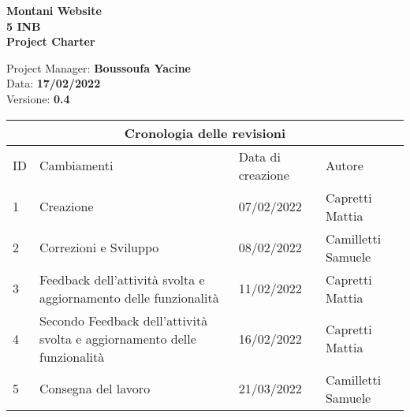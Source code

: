 \documentclass{article}
\begin{document}
	

	

	\begin{titlepage}

		\begin{center}

			\huge\textbf{Montani Website}\\

			\Large\textbf{5 INB}\\

			\Large \textbf{Project Charter}\\

			\vspace{4cm}

			\large Project Manager: \textbf{Boussoufa Yacine}\\

			\large Data: \textbf{17/02/2022}\\

			\large Versione: \textbf{0.4}\\

		\end{center}

	\end{titlepage}

	

	\clearpage

	

	\begin{tabular}{ |p{1cm}|p{4cm}|p{3cm}|p{2cm}|  }

		\hline

		\multicolumn{4}{|c|}{Cronologia delle revisioni} \\

		\hline

		ID& Cambiamenti &Data di creazione&Autore\\

		\hline

		1   & Creazione    &07/02/2022&   Capretti Mattia\\

		\hline

		2   & Correzioni e Sviluppo    &08/02/2022&   Camilletti Samuele\\

		\hline

		3   & Feedback dell'attività svolta e aggiornamento delle funzionalità    &11/02/2022&   Capretti Mattia\\

		\hline

		4   & Secondo Feedback dell'attività svolta e aggiornamento delle funzionalità    &16/02/2022&   Capretti Mattia\\
		
		\hline
		
		5  & Consegna del lavoro   &21/03/2022&   Camilletti Samuele\\
		
		\hline
		

	\end{tabular}
\end{document}
